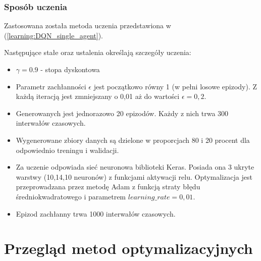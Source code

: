 \documentclass[12pt]{book}
\theoremstyle{plain}
\newcommand{\myref}[1]{(\ref{#1})}
\begin{document}
\subsection{Sposób uczenia}
Zastosowana została metoda uczenia przedstawiona w \myref{learning:DQN_single_agent}. 

Następujące stałe oraz ustalenia określają szczegóły uczenia:
\begin{itemize}
	\item $\gamma = 0.9$ - stopa dyskontowa
	\item Parametr zachłanności $\epsilon$ jest początkowo równy 1 (w pełni losowe epizody). Z każdą iteracją jest zmniejszany o 0,01 aż do wartości $\epsilon=0,2$.
	\item Generowanych jest jednorazowo 20 epizodów. Każdy z nich trwa 300 interwałów czasowych.
	\item Wygenerowane zbiory danych są dzielone w proporcjach 80 i 20 procent dla odpowiednio treningu i walidacji.
	\item Za uczenie odpowiada sieć neuronowa biblioteki Keras. Posiada ona 3 ukryte warstwy (10,14,10 neuronów) z funkcjami aktywacji relu. Optymalizacja jest przeprowadzana przez metodę Adam z funkcją straty błędu średniokwadratowego i parametrem $learning\_rate = 0,01$. 
	\item Epizod zachłanny trwa 1000 interwałów czasowych.
\end{itemize}



\chapter{Przegląd metod optymalizacyjnych}
\end{document}
